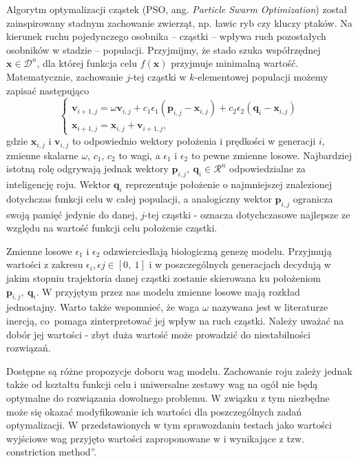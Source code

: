 \documentclass[11pt, a4paper, oneside]{article}
\newcommand{\vect}[1]{\bm{\mathbf{#1}}}
\begin{document}
Algorytm optymalizacji cząstek (PSO, ang. {\it Particle Swarm Optimization}) został zainspirowany stadnym zachowanie zwierząt, np. ławic ryb czy kluczy ptaków. Na kierunek ruchu pojedynczego osobnika -- cząstki -- wpływa ruch pozostałych osobników w stadzie -- populacji. Przyjmijmy, że stado szuka współrzędnej $\vect{x} \in \mathcal{D}^{n}$, dla której funkcja celu $f\left(\vect{x}\right)$ przyjmuje minimalną wartość. Matematycznie, zachowanie $j$-tej cząstki w $k$-elementowej populacji możemy zapisać następująco
\begin{equation}
\begin{cases}
\vect{v}_{i + 1, j} = \omega \vect{v}_{i, j} + c_{1} \epsilon_{1} \left(\vect{p}_{i, j} - \vect{x}_{i, j}\right) + c_{2} \epsilon_{2} \left(\vect{q}_{i} - \vect{x}_{i, j}\right) \\
\vect{x}_{i + 1, j} = \vect{x}_{i, j} + \vect{v}_{i + 1, j},
\end{cases}
\end{equation}
gdzie $\vect{x}_{i, j}$ i $\vect{v}_{i, j}$ to odpowiednio wektory położenia i prędkości w generacji $i$, zmienne skalarne $\omega$, $c_1$, $c_2$ to wagi, a $\epsilon_{1}$ i  $\epsilon_{2}$ to pewne zmienne losowe. Najbardziej istotną rolę odgrywają jednak wektory $\vect{p}_{i, j}, \ \vect{q}_{i} \in \mathcal{R}^{n}$ odpowiedzialne za inteligencję roju. Wektor $\vect{q}_{i}$ reprezentuje położenie o najmniejszej znalezionej dotychczas funkcji celu w całej populacji, a analogiczny wektor $\vect{p}_{i, j}$ ogranicza swoją pamięć jedynie do danej, $j$-tej cząstki - oznacza dotychczasowe najlepsze ze względu na wartość funkcji celu położenie cząstki.

Zmienne losowe $\epsilon_{1}$ i $\epsilon_{2}$ odzwierciedlają biologiczną genezę modelu. Przyjmują wartości z zakresu $\epsilon_{i}, \epsilon{j} \in \left[0, \ 1\right]$ i w poszczególnych generacjach decydują w jakim stopniu trajektoria danej cząstki zostanie skierowana ku położeniom $\vect{p}_{i, j}, \ \vect{q}_{i}$. W przyjętym przez nas modelu zmienne losowe mają rozkład jednostajny. Warto także wspomnieć, że waga $\omega$ nazywana jest w literaturze \cite{BrattonKennedy} inercją, co~pomaga zinterpretować jej wpływ na ruch cząstki. Należy uważać na dobór jej wartości - zbyt duża wartość może prowadzić do niestabilności rozwiązań.

Dostępne są różne propozycje doboru wag modelu. Zachowanie roju zależy jednak także od kształtu funkcji celu i uniwersalne zestawy wag na ogół nie będą optymalne do rozwiązania dowolnego problemu. W związku z tym niezbędne może się okazać modyfikowanie ich wartości dla poszczególnych zadań optymalizacji. W przedstawionych w tym sprawozdaniu testach jako wartości wyjściowe wag przyjęto wartości zaproponowane w \cite{BrattonKennedy} i wynikające z tzw. \quotedblbase constriction method\textquotedblright.
\end{document}
